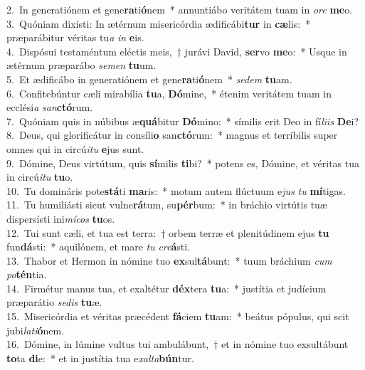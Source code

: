 {2.~}In generatiónem et gene\textbf{ra}ti\textbf{ó}nem~* annuntiábo veritátem tuam in \textit{o}\textit{re} \textbf{me}o.\\
{3.~}Quóniam dixísti: In ætérnum misericórdia ædificábi\textbf{tur} in \textbf{cæ}lis:~* præparábitur véritas tu\textit{a} \textit{in} \textbf{e}is.\\
{4.~}Dispósui testaméntum eléctis meis,~† jurávi David, \textbf{ser}vo \textbf{me}o:~* Usque in ætérnum præparábo \textit{se}\textit{men} \textbf{tu}um.\\
{5.~}Et ædificábo in generatiónem et gene\textbf{ra}ti\textbf{ó}nem~* \textit{se}\textit{dem} \textbf{tu}am.\\
{6.~}Confitebúntur cæli mirabília \textbf{tu}a, \textbf{Dó}mine,~* étenim veritátem tuam in ecclési\textit{a} \textit{san}\textbf{ctó}rum.\\
{7.~}Quóniam quis in núbibus æ\textbf{quá}bitur \textbf{Dó}mino:~* símilis erit Deo in fí\textit{li}\textit{is} \textbf{De}i?\\
{8.~}Deus, qui glorificátur in consíli\textbf{o} san\textbf{ctó}rum:~* magnus et terríbilis super omnes qui in circú\textit{i}\textit{tu} \textbf{e}jus sunt.\\
{9.~}Dómine, Deus virtútum, quis \textbf{sí}milis \textbf{ti}bi?~* potens es, Dómine, et véritas tua in circú\textit{i}\textit{tu} \textbf{tu}o.\\
{10.~}Tu domináris pote\textbf{stá}ti \textbf{ma}ris:~* motum autem flúctuum e\textit{jus} \textit{tu} \textbf{mí}tigas.\\
{11.~}Tu humiliásti sicut vulne\textbf{rá}tum, su\textbf{pér}bum:~* in bráchio virtútis tuæ dispersísti ini\textit{mí}\textit{cos} \textbf{tu}os.\\
{12.~}Tui sunt cæli, et tua est terra:~† orbem terræ et plenitúdinem ejus \textbf{tu} fun\textbf{dá}sti:~* aquilónem, et mare \textit{tu} \textit{cre}\textbf{á}sti.\\
{13.~}Thabor et Hermon in nómine tuo \textbf{ex}sul\textbf{tá}bunt:~* tuum bráchium \textit{cum} \textit{po}\textbf{tén}tia.\\
{14.~}Firmétur manus tua, et exaltétur \textbf{déx}tera \textbf{tu}a:~* justítia et judícium præparátio \textit{se}\textit{dis} \textbf{tu}æ.\\
{15.~}Misericórdia et véritas præcédent \textbf{fá}ciem \textbf{tu}am:~* beátus pópulus, qui scit jubi\textit{la}\textit{ti}\textbf{ó}nem.\\
{16.~}Dómine, in lúmine vultus tui ambulábunt,~† et in nómine tuo exsultábunt \textbf{to}ta \textbf{di}e:~* et in justítia tua e\textit{xal}\textit{ta}\textbf{bún}tur.\\
